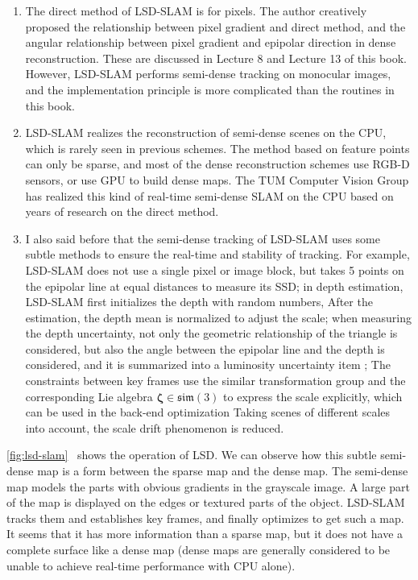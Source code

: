 \begin{enumerate}
	\item The direct method of LSD-SLAM is for pixels. The author creatively proposed the relationship between pixel gradient and direct method, and the angular relationship between pixel gradient and epipolar direction in dense reconstruction. These are discussed in Lecture 8 and Lecture 13 of this book. However, LSD-SLAM performs semi-dense tracking on monocular images, and the implementation principle is more complicated than the routines in this book.
	\item LSD-SLAM realizes the reconstruction of semi-dense scenes on the CPU, which is rarely seen in previous schemes. The method based on feature points can only be sparse, and most of the dense reconstruction schemes use RGB-D sensors, or use GPU to build dense maps\textsuperscript{\cite{Kerl2013}}. The TUM Computer Vision Group has realized this kind of real-time semi-dense SLAM on the CPU based on years of research on the direct method.
	\item I also said before that the semi-dense tracking of LSD-SLAM uses some subtle methods to ensure the real-time and stability of tracking. For example, LSD-SLAM does not use a single pixel or image block, but takes 5 points on the epipolar line at equal distances to measure its SSD; in depth estimation, LSD-SLAM first initializes the depth with random numbers, After the estimation, the depth mean is normalized to adjust the scale; when measuring the depth uncertainty, not only the geometric relationship of the triangle is considered, but also the angle between the epipolar line and the depth is considered, and it is summarized into a luminosity uncertainty item ; The constraints between key frames use the similar transformation group and the corresponding Lie algebra $\bm{\zeta} \in \mathfrak{sim}(3)$ to express the scale explicitly, which can be used in the back-end optimization Taking scenes of different scales into account, the scale drift phenomenon is reduced.
\end{enumerate}

\autoref{fig:lsd-slam}~ shows the operation of LSD. We can observe how this subtle semi-dense map is a form between the sparse map and the dense map. The semi-dense map models the parts with obvious gradients in the grayscale image. A large part of the map is displayed on the edges or textured parts of the object. LSD-SLAM tracks them and establishes key frames, and finally optimizes to get such a map. It seems that it has more information than a sparse map, but it does not have a complete surface like a dense map (dense maps are generally considered to be unable to achieve real-time performance with CPU alone).


